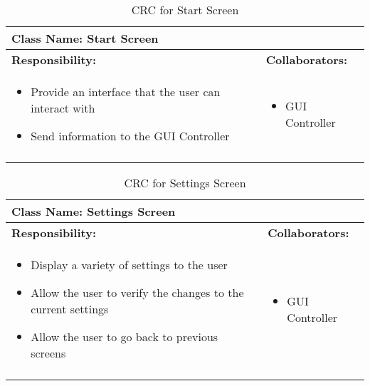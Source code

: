 \documentclass[titlepage]{article}
\begin{document}
	\begin{longtable}{| p{} | p{} |}
			\hline
			 \multicolumn{2}{|l|}{\textbf{Class Name: Start Screen}} \\
			\hline
			\textbf{Responsibility:} & \textbf{Collaborators:} \\
			\hline
				\begin{itemize}
					\item Provide an interface that the user can interact with
					\item Send information to the GUI Controller
				\end{itemize} & 
				\begin{itemize}
					\item GUI Controller
				\end{itemize} 
				\\
			\hline
		\caption{CRC for Start Screen}
	\end{longtable}
	
	\begin{longtable}{| p{} | p{} |}
			\hline
			 \multicolumn{2}{|l|}{\textbf{Class Name: Settings Screen}} \\
			\hline
			\textbf{Responsibility:} & \textbf{Collaborators:} \\
			\hline
				\begin{itemize}
					\item Display a variety of settings to the user
					\item Allow the user to verify the changes to the current settings
					\item Allow the user to go back to previous screens
				\end{itemize} & 
				\begin{itemize}
					\item GUI Controller
				\end{itemize} 
				\\
			\hline
		\caption{CRC for Settings Screen}
	\end{longtable}
	
\end{document}
